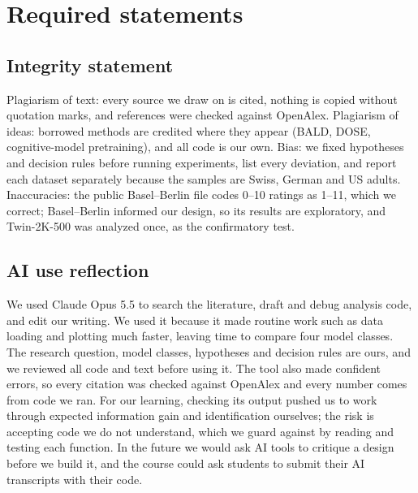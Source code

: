 \providecommand{\finalonly}[1]{}
\section*{Required statements}

\subsection*{Integrity statement}
Plagiarism of text: every source we draw on is cited, nothing is copied without quotation marks, and references were checked against OpenAlex. Plagiarism of ideas: borrowed methods are credited where they appear (BALD, DOSE, cognitive-model pretraining), and all code is our own. Bias: we fixed hypotheses and decision rules before running experiments, list every deviation, and report each dataset separately because the samples are Swiss, German and US adults. Inaccuracies: the public Basel--Berlin file codes 0--10 ratings as 1--11, which we correct; Basel--Berlin informed our design, so its results are exploratory, and Twin-2K-500 was analyzed once, as the confirmatory test.\finalonly{ Selective reporting: results that went against our hypotheses, H1 and H2, are reported as fully as those that supported them, and every number, figure and table in the paper is produced by the submitted code from the public data.}

\subsection*{AI use reflection}
We used Claude Opus 5.5 to search the literature, draft and debug analysis code, and edit our writing. We used it because it made routine work such as data loading and plotting much faster, leaving time to compare four model classes. The research question, model classes, hypotheses and decision rules are ours, and we reviewed all code and text before using it. The tool also made confident errors, so every citation was checked against OpenAlex and every number comes from code we ran. For our learning, checking its output pushed us to work through expected information gain and identification ourselves; the risk is accepting code we do not understand, which we guard against by reading and testing each function. In the future we would ask AI tools to critique a design before we build it, and the course could ask students to submit their AI transcripts with their code.

